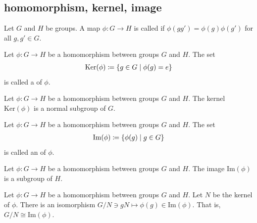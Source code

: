 \subsection{homomorphism, kernel, image}

\begin{screen}
  \begin{definition}[homomorphism]
    Let $G$ and $H$ be groups.
    A map $\phi: G \to H$ is called  if $\phi(gg') = \phi(g) \phi(g')$ for all $g, g' \in G$.
  \end{definition}
\end{screen}

\begin{screen}
  \begin{definition}[kernel]
    Let $\phi: G \to H$ be a homomorphism between groups $G$ and $H$.
    The set
    \begin{align}
      \mathrm{Ker}(\phi) \coloneqq \left\{  g \in G  \mathrel{}\middle|\mathrel{}  \phi(g) = e  \right\}
    \end{align}
    is called a  of $\phi$.
  \end{definition}
\end{screen}

\begin{screen}
  \begin{prop}
    Let $\phi: G \to H$ be a homomorphism between groups $G$ and $H$.
    The kernel $\mathrm{Ker}(\phi)$ is a normal subgroup of $G$.
  \end{prop}
\end{screen}

\begin{screen}
  \begin{definition}[image]
    Let $\phi: G \to H$ be a homomorphism between groups $G$ and $H$.
    The set
    \begin{align}
      \mathrm{Im}(\phi) \coloneqq \left\{  \phi(g)  \mathrel{}\middle|\mathrel{}  g \in G  \right\}
    \end{align}
    is called an  of $\phi$.
  \end{definition}
\end{screen}

\begin{screen}
  \begin{prop}
    Let $\phi: G \to H$ be a homomorphism between groups $G$ and $H$.
    The image $\mathrm{Im}(\phi)$ is a subgroup of $H$.
  \end{prop}
\end{screen}

\begin{screen}
  \begin{them}
    Let $\phi: G \to H$ be a homomorphism between groups $G$ and $H$.
    Let $N$ be the kernel of $\phi$.
    There is an isomorphism $G/N \ni gN \mapsto \phi(g) \in \mathrm{Im}(\phi)$.
    That is, $G/N \cong \mathrm{Im}(\phi)$.
  \end{them}
\end{screen}

